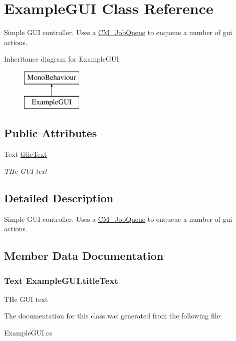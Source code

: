 \hypertarget{class_example_g_u_i}{}\section{Example\+G\+U\+I Class Reference}
\label{class_example_g_u_i}


Simple G\+U\+I controller. Uses a \hyperlink{class_c_m___job_queue}{C\+M\+\_\+\+Job\+Queue} to enqueue a number of gui actions.  


Inheritance diagram for Example\+G\+U\+I\+:\begin{figure}[H]
\begin{center}
\leavevmode
\includegraphics[height=2.000000cm]{class_example_g_u_i}
\end{center}
\end{figure}
\subsection*{Public Attributes}
\begin{DoxyCompactItemize}
\item 
Text \hyperlink{class_example_g_u_i_a2eaf69cbe810531fcc820e264c288698}{title\+Text}
\begin{DoxyCompactList}\small\item\em T\+He G\+U\+I text \end{DoxyCompactList}\end{DoxyCompactItemize}


\subsection{Detailed Description}
Simple G\+U\+I controller. Uses a \hyperlink{class_c_m___job_queue}{C\+M\+\_\+\+Job\+Queue} to enqueue a number of gui actions. 



\subsection{Member Data Documentation}
\hypertarget{class_example_g_u_i_a2eaf69cbe810531fcc820e264c288698}{}
\subsubsection[{title\+Text}]{\setlength{\rightskip}{0pt plus 5cm}Text Example\+G\+U\+I.\+title\+Text}\label{class_example_g_u_i_a2eaf69cbe810531fcc820e264c288698}


T\+He G\+U\+I text 



The documentation for this class was generated from the following file\+:\begin{DoxyCompactItemize}
\item 
Example\+G\+U\+I.\+cs\end{DoxyCompactItemize}
